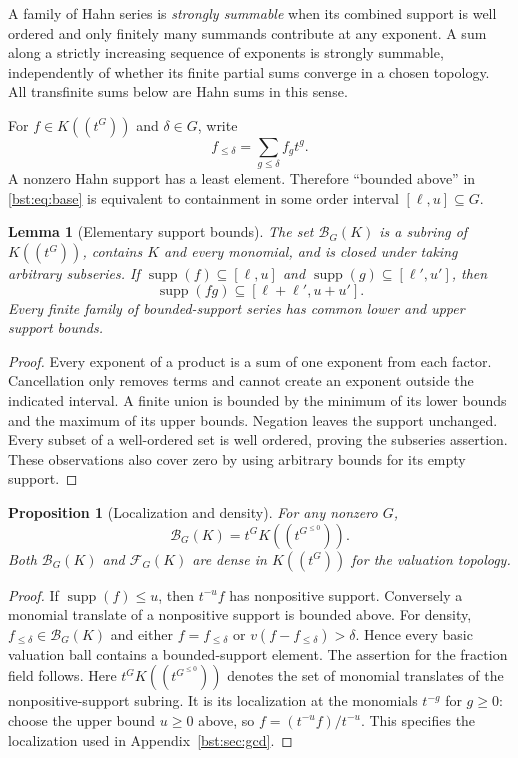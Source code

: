 \documentclass[11pt,letterpaper]{article}
\newtheorem{lemma}[theorem]{Lemma}
\newtheorem{proposition}[theorem]{Proposition}
\theoremstyle{definition}
\theoremstyle{remark}
\newcommand{\supp}{\operatorname{supp}}
\newcommand{\HH}[2]{#1((t^{#2}))}
\newcommand{\BB}[2]{\mathcal B_{#2}(#1)}
\newcommand{\FF}[2]{\mathcal F_{#2}(#1)}
\begin{document}
A family of Hahn series is \emph{strongly summable} when its combined support
is well ordered and only finitely many summands contribute at any exponent.
A sum along a strictly increasing sequence of exponents is strongly
summable, independently of whether its finite partial sums converge in a
chosen topology. All transfinite sums below are Hahn sums in this sense.

For $f\in\HH KG$ and $\delta\in G$, write
\[
 f_{\le\delta}=\sum_{g\le\delta} f_g t^g.
\]
A nonzero Hahn support has a least element. Therefore ``bounded above'' in
\eqref{bst:eq:base} is equivalent to containment in some order interval
$[\ell,u]\subseteq G$.

\begin{lemma}[Elementary support bounds]\label{bst:lem:bounds}
The set $\BB KG$ is a subring of $\HH KG$, contains $K$ and every monomial,
and is closed under taking arbitrary subseries. If
$\supp(f)\subseteq[\ell,u]$ and
$\supp(g)\subseteq[\ell',u']$, then
\[
 \supp(fg)\subseteq[\ell+\ell',u+u'].
\]
Every finite family of bounded-support series has common lower and upper
support bounds.
\end{lemma}
\begin{proof}
Every exponent of a product is a sum of one exponent from each factor.
Cancellation only removes terms and cannot create an exponent outside the
indicated interval. A finite union is bounded by the minimum of its lower
bounds and the maximum of its upper bounds. Negation leaves the support
unchanged. Every subset of a well-ordered set is well ordered, proving the
subseries assertion. These observations also cover zero by using arbitrary
bounds for its empty support.
\end{proof}

\begin{proposition}[Localization and density]\label{bst:prop:localdensity}
For any nonzero $G$,
\[
 \BB KG=t^G K((t^{G^{\le0}})).
\]
Both $\BB KG$ and $\FF KG$ are dense in $\HH KG$ for the valuation topology.
\end{proposition}
\begin{proof}
If $\supp(f)\le u$, then $t^{-u}f$ has nonpositive support. Conversely a
monomial translate of a nonpositive support is bounded above. For density,
$f_{\le\delta}\in\BB KG$ and either $f=f_{\le\delta}$ or
$v(f-f_{\le\delta})>\delta$. Hence every basic valuation ball contains a
bounded-support element. The assertion for the fraction field follows.
Here $t^G K((t^{G^{\le0}}))$ denotes the set of monomial translates of
the nonpositive-support subring. It is its localization at the monomials
$t^{-g}$ for $g\ge0$: choose the upper bound $u\ge0$ above, so
$f=(t^{-u}f)/t^{-u}$. This specifies the localization used in Appendix~\ref{bst:sec:gcd}.
\end{proof}
\end{document}
